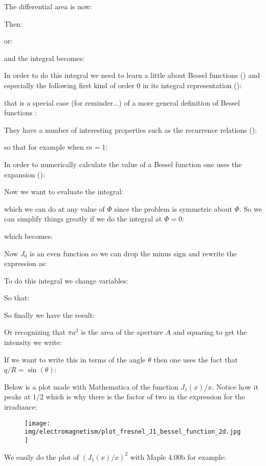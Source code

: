 	The differential area is now:
	
	Then:
	
	or:
	
	and the integral becomes:
	
	In order to do this integral we need to learn a little about Bessel functions () and especially the following first kind of order $0$ in its integral representation ():
	
	that is a special case (for reminder...) of a more general definition of Bessel functions :
	
	They have a number of interesting properties such as the recurrence relations ():
	
	so that for example when $m=1$:
	
	In order to numerically calculate the value of a Bessel function one uses the expansion (): 
	
	Now we want to evaluate the integral:
	
	which we can do at any value of $\Phi$ since the problem is symmetric about $\Phi$. So we can simplify things greatly if we do the integral at $\Phi=0$:
	
	which becomes:
	
	Now $J_0$ is an even function so we can drop the minus sign and rewrite the expression as:
	
	To do this integral we change variables:
	
	So that:
	
	So finally we have the result:
	
	Or recognizing that $\pi a^2$ is the area of the aperture $A$ and squaring to get the intensity we write:
	
	If we want to write this in terms of the angle $\theta$ then one uses the fact that $q/R=\sin(\theta)$:
	
	Below is a plot made with Mathematica of the function $J_1(x)/x$. Notice how it peaks at $1/2$ which is why there is the factor of two in the expression for the irradiance:
	\begin{figure}[H]
		\centering
		\texttt{[image: img/electromagnetism/plot\_fresnel\_J1\_bessel\_function\_2d.jpg]}
	\end{figure}
	We easily do the plot of $(J_1(x)/x)^2$ with Maple 4.00b for example:
	
